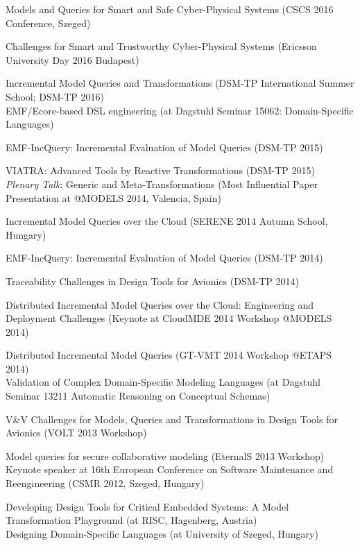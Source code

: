\documentclass{xetexCV}
\begin{document}
Models and Queries for Smart and Safe Cyber-Physical Systems (CSCS 2016 Conference, Szeged)

Challenges for Smart and Trustworthy Cyber-Physical Systems (Ericsson University Day 2016 Budapest)

Incremental Model Queries and Transformations (DSM-TP International Summer School; DSM-TP 2016) \\

EMF/Ecore-based DSL engineering  (at Dagstuhl Seminar 15062:  Domain-Specific Languages)

EMF-IncQuery: Incremental Evaluation of Model Queries (DSM-TP 2015)  

VIATRA: Advanced Tools by Reactive Transformations (DSM-TP 2015) \\

\emph{Plenary Talk}: Generic and Meta-Transformations  (Most Influential Paper Presentation at @MODELS 2014, Valencia, Spain)

Incremental Model Queries over the Cloud (SERENE 2014 Autumn School, Hungary)


EMF-IncQuery: Incremental Evaluation of Model Queries (DSM-TP 2014)


Traceability Challenges in Design Tools for Avionics (DSM-TP 2014) 

Distributed Incremental  Model Queries over the Cloud: Engineering and Deployment Challenges 
(Keynote at CloudMDE 2014 Workshop @MODELS 2014)


Distributed Incremental Model Queries (GT-VMT 2014 Workshop @ETAPS 2014) \\


Validation of Complex Domain-Specific Modeling Languages  (at Dagstuhl Seminar 13211 
Automatic Reasoning on Conceptual Schemas)


V\&V Challenges for Models, Queries and Transformations in Design Tools for Avionics (VOLT 2013 Workshop)


Model queries for secure collaborative modeling (EternalS 2013 Workshop) \\

Keynote speaker  at 16th European Conference on Software Maintenance
and Reengineering (CSMR 2012, Szeged, Hungary) 

Developing Design Tools for Critical Embedded Systems: A Model Transformation Playground
(at RISC, Hagenberg, Austria) \\

Designing Domain-Specific Languages (at University of Szeged, Hungary)
 \\
\end{document}
